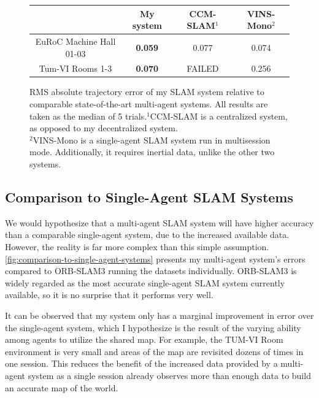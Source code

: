 \begin{figure}[h]
    \centering
    \def\arraystretch{1.2}
    \small
    \begin{tabular}{ |c|c|c|c| }
        \cline{2-4}
        \multicolumn{1}{c|}{}    & My system      & CCM-SLAM$^1$ & VINS-Mono$^2$ \\
        \hline
        EuRoC Machine Hall 01-03 & \textbf{0.059} & 0.077        & 0.074         \\
        \hline
        Tum-VI Rooms 1-3         & \textbf{0.070} & FAILED       & 0.256         \\
        \hline
    \end{tabular}

    \caption{RMS absolute trajectory error of my SLAM system relative to comparable state-of-the-art multi-agent systems. All results are taken as the median of 5 trials.\captionbreak $^1$CCM-SLAM is a centralized system, as opposed to my decentralized system. \\ $^2$VINS-Mono is a single-agent SLAM system run in multisession mode. Additionally, it requires inertial data, unlike the other two systems.}
    \label{fig:comparison-to-multi-agent-systems}
\end{figure}

\subsection{Comparison to Single-Agent SLAM Systems}
We would hypothesize that a multi-agent SLAM system will have higher accuracy than a comparable single-agent system, due to the increased available data. However, the reality is far more complex than this simple assumption. \autoref{fig:comparison-to-single-agent-systems} presents my multi-agent system's errors compared to ORB-SLAM3 running the datasets individually. ORB-SLAM3 is widely regarded as the most accurate single-agent SLAM system currently available, so it is no surprise that it performs very well.

It can be observed that my system only has a marginal improvement in error over the single-agent system, which I hypothesize is the result of the varying ability among agents to utilize the shared map. For example, the TUM-VI Room environment is very small and areas of the map are revisited dozens of times in one session. This reduces the benefit of the increased data provided by a multi-agent system as a single session already observes more than enough data to build an accurate map of the world.

